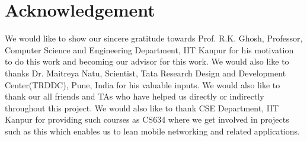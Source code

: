 \documentclass[10pt,conference,letterpaper]{IEEEtran}
\begin{document}
\section{Acknowledgement}
We would like to show our sincere gratitude towards Prof. R.K. Ghosh, Professor, Computer Science and Engineering
Department, IIT Kanpur for his motivation to do this work and becoming our advisor for this work. We would also like to thanks Dr. Maitreya Natu, Scientist, Tata Research Design and Development Center(TRDDC), Pune, India for his valuable inputs. We would
also like to thank our all friends and TAs who have helped us directly or indirectly throughout this project. We would also like to thank CSE Department, IIT Kanpur for providing such courses as CS634 where we get involved in projects such as this which enables us to lean mobile networking and related applications.




 
\nocite{*}
\end{document}
